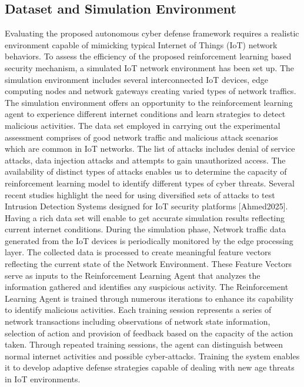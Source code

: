 \documentclass[12pt]{article}
\begin{document}
	\subsection{Dataset and Simulation Environment}
    Evaluating the proposed autonomous cyber defense framework requires a realistic environment capable of mimicking typical Internet of Things (IoT) network behaviors. To assess the efficiency of the proposed reinforcement learning based security mechanism, a simulated IoT network environment has been set up. The simulation environment includes several interconnected IoT devices, edge computing nodes and network gateways creating varied types of network traffics. The simulation environment offers an opportunity to the reinforcement learning agent to experience different internet conditions and learn strategies to detect malicious activities.
The data set employed in carrying out the experimental assessment comprises of good network traffic and malicious attack scenarios which are common in IoT networks. The list of attacks includes denial of service attacks, data injection attacks and attempts to gain unauthorized access. The availability of distinct types of attacks enables us to determine the capacity of reinforcement learning model to identify different types of cyber threats. Several recent studies highlight the need for using diversified sets of attacks to test Intrusion Detection Systems designed for IoT security platforms [Ahmed2025]. Having a rich data set will enable to get accurate simulation results reflecting current internet conditions. 
During the simulation phase, Network traffic data generated from the IoT devices is periodically monitored by the edge processing layer. The collected data is processed to create meaningful feature vectors reflecting the current state of the Network Environment. These Feature Vectors serve as inputs to the Reinforcement Learning Agent that analyzes the information gathered and identifies any suspicious activity. 
The Reinforcement Learning Agent is trained through numerous iterations to enhance its capability to identify malicious activities. Each training session represents a series of network transactions including observations of network state information, selection of action and provision of feedback based on the capacity of the action taken. Through repeated training sessions, the agent can distinguish between normal internet activities and possible cyber-attacks. Training the system enables it to develop adaptive defense strategies capable of dealing with new age threats in IoT environments.\cite{Ahmed2025, Singh2024, Nguyen2023, Palmer2024, Jamshidi2025}
\end{document}
